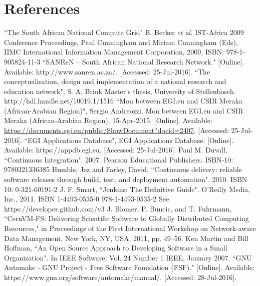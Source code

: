 \documentclass[a4paper]{jpconf}
\begin{document}
	\section*{References}
	\begin{thebibliography}{9}
		  ``The South African National Compute Grid" B. Becker {\it et al.} IST-Africa 2009 Conference Proceedings, Paul Cunningham and Miriam Cunningham (Eds), IIMC International Information Management Corporation, 2009, ISBN: 978-1-905824-11-3
		 ``SANReN – South African National Research Network." [Online]. Available: http://www.sanren.ac.za/. [Accessed: 25-Jul-2016].
		 ``The conceptualisation, design and implementation of a national research and education network", S. A. Brink Master's thesis, University of Stellenbosch. http://hdl.handle.net/10019.1/1516
		 ``Mou between EGI.eu and CSIR Meraka (African-Arabian Region)", Sergio Andreozzi. Mou between EGI.eu and CSIR Meraka (African-Arabian Region), 15-Apr-2015. [Online]. Available: \url{https://documents.egi.eu/public/ShowDocument?docid=2407}. [Accessed: 25-Jul-2016].
		 ``EGI Applications Database", EGI Applications Database. [Online]. Available: https://appdb.egi.eu. [Accessed: 25-Jul-2016].
		 Paul M. Duvall, ``Continuous Integration". 2007. Pearson Educational Publishers.  ISBN-10: 9780321336385
		 Humble, Jez and Farley, David, ``Continuous delivery: reliable software releases through build, test, and deployment automation". 2010. ISBN 10: 0-321-60191-2
		 J. F. Smart, ``Jenkins: The Definitive Guide". O’Reilly Media, Inc., 2011. ISBN 1-4493-0535-0 978-1-4493-0535-2
		 See https://developer.github.com/v3
		 J. Blomer, P. Buncic, and T. Fuhrmann, ``CernVM-FS: Delivering Scientific Software to Globally Distributed Computing Resources," in Proceedings of the First International Workshop on Network-aware Data Management, New York, NY, USA, 2011, pp. 49–56.
     Ken Martin and Bill Hoffman, ``An Open Source Approach to Developing Software in a Small Organization". In IEEE Software, Vol. 24 Number 1 IEEE, January 2007.
     ``GNU Automake - GNU Project - Free Software Foundation (FSF)." [Online]. Available: https://www.gnu.org/software/automake/manual/. [Accessed: 28-Jul-2016].


	\end{thebibliography}
\end{document}
